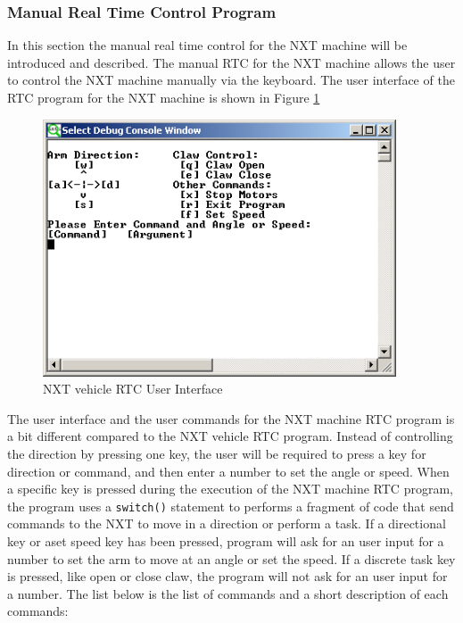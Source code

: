 \documentclass[12pt]{article}
\begin{document}
\subsubsection{Manual Real Time Control Program}
In this section the manual real time control for the NXT machine will be introduced and described.
The manual RTC for the NXT machine allows the user to control the NXT machine manually via the keyboard.
The user interface of the RTC program for the NXT machine is shown in Figure \ref{fig_mach_UI}
\begin{figure}[h]
  \begin{center}
    \includegraphics[height=3in]{figure/mindstorm/mach_UI.png}
    \caption{NXT vehicle RTC User Interface \label{fig_mach_UI}}
  \end{center}
\end{figure}
The user interface and the user commands for the NXT machine RTC program is a bit different compared to the
    NXT vehicle RTC program.
Instead of controlling the direction by pressing one key, the user will be required to press a key for
    direction or command, and then enter a number to set the angle or speed.
When a specific key is pressed during the execution of the NXT machine RTC program, the program uses a
    \verb+switch()+ statement to performs a fragment of code that send commands to the NXT to move in 
    a direction or perform a task.
If a directional key or aset speed key has been pressed, program will ask for an user input for a number
    to set the arm to move at an angle or set the speed.
If a discrete task key is pressed, like open or close claw, the program will not ask for an user input for a number.
The list below is the list of commands and a short description of each commands:
\newpage
\end{document}
